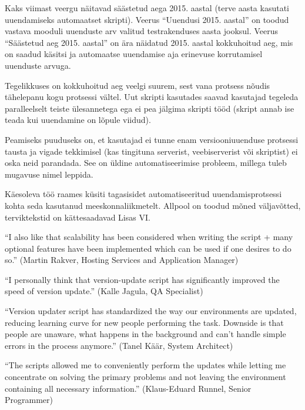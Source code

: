 \documentclass[12pt]{article}
\begin{document}
  Kaks viimast veergu näitavad säästetud aega 2015. aastal (terve aasta kasutati uuendamiseks automaatset skripti). Veerus ``Uuendusi 2015. aastal'' on toodud vastava mooduli uuenduste arv valitud testrakenduses aasta jooksul. Veerus ``Säästetud aeg 2015. aastal'' on ära näidatud 2015. aastal kokkuhoitud aeg, mis on saadud käsitsi ja automaatse uuendamise aja erinevuse korrutamisel uuenduste arvuga.
  
  Tegelikkuses on kokkuhoitud aeg veelgi suurem, sest vana protsess nõudis tähelepanu kogu protsessi vältel. Uut skripti kasutades saavad kasutajad tegeleda paralleelselt teiste ülesannetega ega ei pea jälgima skripti tööd (skript annab ise teada kui uuendamine on lõpule viidud).
  
  Peamiseks puuduseks on, et kasutajad ei tunne enam versiooniuuenduse protsessi tausta ja vigade tekkimisel (kas tingituna serverist, veebiserverist või skriptist) ei oska neid parandada. See on üldine automatiseerimise probleem, millega tuleb mugavuse nimel leppida.
  
   Käesoleva töö raames küsiti tagasisidet automatiseeritud uuendamisprotsessi kohta seda kasutanud meeskonnaliikmetelt. Allpool on toodud mõned väljavõtted, terviktekstid on kättesaadavad Lisas VI.
   
   \begin{displayquote}
   ``I also like that scalability has been considered when writing the script + many optional features have been implemented which can be used if one desires to do so.'' (Martin Rakver, Hosting Services and Application Manager)
   \end{displayquote}
   
   \begin{displayquote}
   ``I personally think that version-update script has significantly improved the speed of version update.'' (Kalle Jagula, QA Specialist)
   \end{displayquote}
   
   \begin{displayquote}
    ``Version updater script has standardized the way our environments are updated, reducing learning curve for new people performing the task. Downside is that people are unaware, what happens in the background and can't handle simple errors in the process anymore.'' (Tanel Käär, System Architect)
    \end{displayquote}
    
    \begin{displayquote}
    ``The scripts allowed me to conveniently perform the updates while letting me concentrate on solving the primary problems and not leaving the environment containing all necessary information.'' (Klaus-Eduard Runnel, Senior Programmer)
    \end{displayquote}
    
\end{document}
